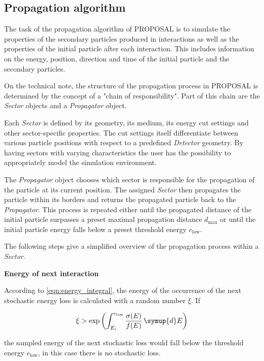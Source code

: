 \subsection{Propagation algorithm}
\label{sec:algorithm}

The task of the propagation algorithm of PROPOSAL is to simulate the properties of the secondary particles produced in interactions as well as the properties of the initial particle after each interaction.
This includes information on the energy, position, direction and time of the initial particle and the secondary particles.

On the technical note, the structure of the propagation process in PROPOSAL is determined by the concept of a "chain of responsibility".
Part of this chain are the \emph{Sector} objects and a \emph{Propagator} object.

Each \emph{Sector} is defined by its geometry, its medium, its energy cut settings and other sector-specific properties.
The cut settings itself differentiate between various particle positions with respect to a predefined \emph{Detector} geometry.
By having sectors with varying characteristics the user has the possibility to appropriately model the simulation environment.

The \emph{Propagator} object chooses which sector is responsible for the propagation of the particle at its current position.
The assigned \emph{Sector} then propagates the particle within its borders and returns the propagated particle back to the \emph{Propagator}.
This process is repeated either until the propagated distance of the initial particle surpasses a preset maximal propagation distance $d_\text{max}$ or until the initial particle energy falls below a preset threshold energy $e_\text{low}$.

The following steps give a simplified overview of the propagation process within a \emph{Sector}.

\textbf{Energy of next interaction}

According to \eqref{eqn:energy_integral}, the energy of the occurrence of the next stochastic energy loss is calculated with a random number $\xi$.
If

\begin{equation}
	\xi > \exp{\left( \int_{E_i}^{e_\text{low}} \frac{\sigma(E)}{f(E)} \, \symup{d}E \right)}
\end{equation}

the sampled energy of the next stochastic loss would fall below the threshold energy $e_\text{low}$, in this case there is no stochastic loss.


